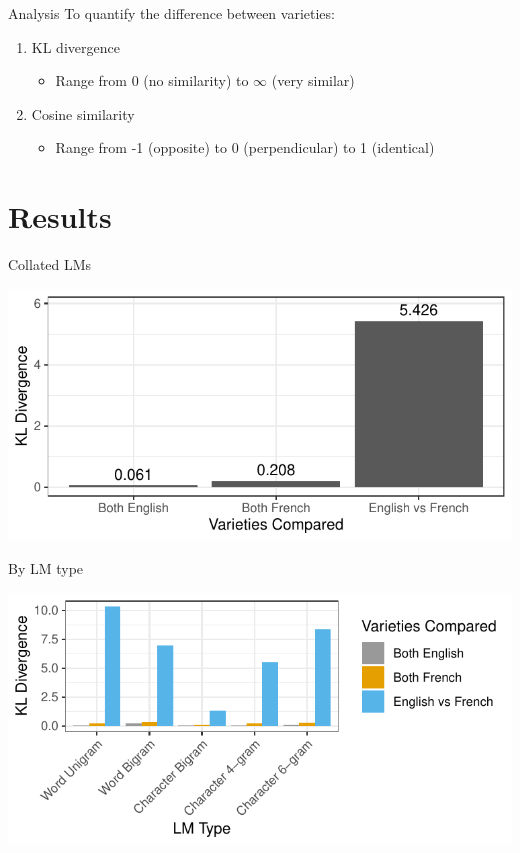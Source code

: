 \documentclass{beamer}\usepackage[]{graphicx}\usepackage[]{color}
\makeatletter
\def\maxwidth{ %
  \ifdim\Gin@nat@width>\linewidth
    \linewidth
  \else
    \Gin@nat@width
  \fi
}
\makeatother
\begin{document}
    \begin{frame}{Analysis}
      To quantify the difference between varieties:
      \begin{enumerate}
        \item \alert{KL divergence}
        \begin{itemize}
          \item Range from 0 (no similarity) to $\infty$ (very similar)
        \end{itemize}
        \item Cosine similarity
        \begin{itemize}
          \item Range from -1 (opposite) to 0 (perpendicular) to 1 (identical)
        \end{itemize}
      \end{enumerate}
    \end{frame}

  \section{Results}
    \begin{frame}{Collated LMs}
      \begin{center}

\includegraphics[width=\maxwidth]{figure/graphKLall-1} 

      \end{center}
    \end{frame}

    \begin{frame}{By LM type}
      \begin{center}

\includegraphics[width=\maxwidth]{figure/graphKLlinglevs-1} 

      \end{center}
    \end{frame}
\end{document}
